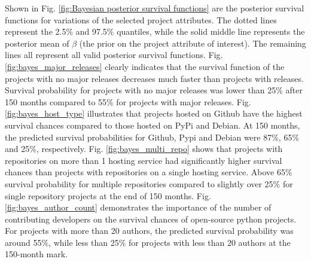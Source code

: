 \documentclass[acmconf]{acmart}
\begin{document}
Shown in Fig. \ref{fig:Bayesian posterior survival functions} are the posterior survival functions for variations of the selected project attributes. 
The dotted lines represent the  2.5\% and 97.5\% quantiles, while the solid middle line represents the posterior mean of $\beta$ (the prior on the project attribute of interest). 
The remaining lines all represent all valid posterior survival functions. 
Fig. \ref{fig:bayes_major_releases} clearly indicates that the survival function of the projects with no major releases decreases much faster than projects with releases. 
Survival probability for projects with no major releases was lower than 25\% after 150 months compared to 55\% for projects with major releases.
Fig. \ref{fig:bayes_host_type} illustrates that projects hosted on Github have the highest survival chances compared to those hosted on PyPi and Debian. 
At 150 months, the predicted survival probabilities for Github, Pypi and Debian were 87\%, 65\% and 25\%, respectively.
Fig. \ref{fig:bayes_multi_repo} shows that projects with repositories on more than 1 hosting service had significantly higher survival chances than projects with repositories on a single hosting service. 
Above 65\% survival probability for multiple repositories compared to slightly over 25\% for single repository projects at the end of 150 months.
Fig. \ref{fig:bayes_author_count} demonstrates the importance of the number of contributing developers on the survival chances of open-source python projects. 
For projects with more than 20 authors, the predicted survival probability was around 55\%, while less than 25\% for projects with less than 20 authors at the 150-month mark.
\end{document}
